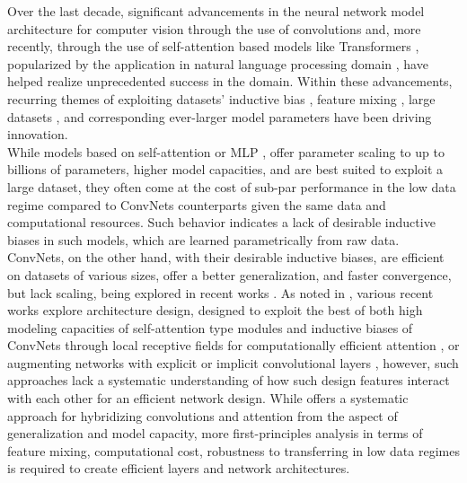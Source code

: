 \documentclass{article}
\begin{document}
    Over the last decade, significant advancements in the neural network model architecture for computer vision through the use of convolutions \cite{AlexNet} and, more recently, through the use of self-attention based models like Transformers \cite{ViT, DBLP:journals/corr/Deit}, popularized by the application in natural language processing domain \cite{NIPS2017_3f5ee243}, have helped realize unprecedented success in the domain. Within these advancements, recurring themes of exploiting datasets' inductive bias \cite{DBLP:journals/corr/CohenW16, DSF-CNN}, feature mixing \cite{DBLP:journals/corr/MLP-Mixer, DBLP:journals/corr/Swin, DBLP:journals/corr/CSwin}, large datasets \cite{DBLP:journals/corr/JFT}, and corresponding ever-larger model parameters \cite{DBLP:journals/corr/MLP-Mixer, DBLP:journals/corr/CoAtNet, ViT, DBLP:journals/corr/Deit} have been driving innovation. \\
    \indent While models based on self-attention \cite{ViT} or MLP \cite{DBLP:journals/corr/MLP-Mixer}, offer parameter scaling to up to billions of parameters, higher model capacities, and are best suited to exploit a large dataset, they often come at the cost of sub-par performance in the low data regime compared to ConvNets counterparts given the same data and computational resources. Such behavior indicates a lack of desirable inductive biases in such models, which are learned parametrically from raw data. ConvNets, on the other hand, with their desirable inductive biases, are efficient on datasets of various sizes, offer a better generalization, and faster convergence, but lack scaling, being explored in recent works \cite{DBLP:journals/corr/ConvNext}. As noted in \cite{DBLP:journals/corr/CoAtNet}, various recent works explore architecture design, designed to exploit the best of both high modeling capacities of self-attention type modules and inductive biases of ConvNets through local receptive fields for computationally efficient attention \cite{DBLP:journals/corr/Swin, DBLP:journals/corr/CSwin, chen2022regionvit, DBLP:journals/corr/halonet}, or augmenting networks with explicit or implicit convolutional layers \cite{DBLP:journals/corr/CvT}, however, such approaches lack a systematic understanding of how such design features interact with each other for an efficient network design. While \cite{DBLP:journals/corr/CoAtNet} offers a systematic approach for hybridizing convolutions and attention from the aspect of generalization and model capacity, more first-principles analysis in terms of feature mixing, computational cost, robustness to transferring in low data regimes is required to create efficient layers and network architectures. \\
\end{document}

